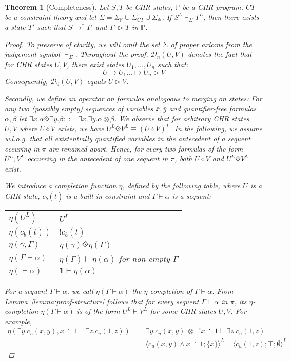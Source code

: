 \documentclass[acmtocl]{acmtrans2m}
\newtheorem{theorem}{Theorem}[section]
\newcommand\state[1]{\langle #1 \rangle}
\newcommand\ent{\rhd}
\newcommand{\bbP}{\ensuremath{\mathbb{P}}}
\newcommand{\cD}{\ensuremath{\mathcal{D}}}
\newcommand{\cb}{\ensuremath{c_b(\bar t)}}
\newcommand{\Sct}{\ensuremath{\Sigma_{CT}}}
\newcommand{\Seq}{\ensuremath{\Sigma_{\doteq}}}
\newcommand{\Sp}{\ensuremath{\Sigma_\mathbb{P}}}
\newcommand{\by}{\bar{y}}
\newcommand{\bx}{\bar{x}}
\newcommand{\x}{{\;\otimes\;}}
\newcommand{\bang}{\; !}
\newcommand{\lone}{\boldsymbol{1}}
\begin{document}
\begin{theorem}[Completeness]
\label{thm:completeness}
   Let $S,T$ be CHR states, $\bbP$ be a CHR program, $CT$ be a constraint theory
   and let  $\Sigma=\Sp\cup\Sct\cup\Seq$. If $S^L\vdash_\Sigma T^L$, then there
   exists a state $T'$ such that $S\mapsto^{*} T'$ and $T'\ent T$ in $\bbP$.
\begin{proof}
To preserve of clarity, we will omit the set $\Sigma$ of proper axioms from the
judgement symbol $\vdash_\Sigma$. Throughout the proof, $\cD_n(U,V)$ denotes
the fact that for CHR states $U,V$, there exist states $U_1,\ldots, U_n$ such that:
	\[
		U \mapsto U_1 \ldots \mapsto U_n \ent V
	\]
Consequently, $\cD_0(U,V)$ equals $U\ent V$.

Secondly, we define an operator on formulas analogoous to merging on states: For
any two (possibly empty) sequences of variables $\bx,\by$ and quantifier-free formulas $\alpha,\beta$ let
$\exists\bx.\alpha\Diamonddot\exists\by.\beta::=\exists\bx.\exists\by.\alpha\otimes\beta$.
We observe that for arbitrary CHR states $U,V$ where $U\diamond V$ exists, we
have $U^L\Diamonddot V^L \equiv (U\diamond V)^L$.
In the following, we assume w.l.o.g. that all existentially quantified variables
in the antecedent of a sequent occuring in $\pi$ are renamed apart. Hence, for
every two formulas of the form $U^L,V^L$ occurring in
the antecedent of one sequent in $\pi$, both $U\diamond V$ and $U^L\Diamonddot V^L$
exist.

We introduce a completion function $\eta$, defined by the following table,
where $U$ is a CHR state, $\cb$ is a built-in constraint and
$\Gamma\vdash\alpha$ is a sequent:

	\medskip
	\begin{tabular}{l @{\hspace{1mm} $::=$ \hspace{1mm}} l}
	  $\eta(U^L)$ & $U^L$ \\
	  $\eta(\cb)$ & $!\cb$ \\
	  $\eta(\gamma,\Gamma)$ & $\eta(\gamma)\Diamonddot\eta(\Gamma)$ \\
	  $\eta(\Gamma\vdash\alpha)$ & $\eta(\Gamma)\vdash\eta(\alpha)$
	  	\quad for non-empty $\Gamma$ \\
	  $\eta(\vdash\alpha)$ & $\lone\vdash\eta(\alpha)$ \\
	\end{tabular}

\medskip
For a sequent $\Gamma\vdash\alpha$, we call $\eta(\Gamma\vdash\alpha)$ the
$\eta$-completion of $\Gamma\vdash\alpha$. From Lemma~\ref{lemma:proof-structure}
follows that for every sequent $\Gamma\vdash\alpha$ in $\pi$, its
$\eta$-completion $\eta(\Gamma\vdash\alpha)$ is of the form $U^L\vdash V^L$ for
some CHR states $U,V$. For example,
	\begin{align*}
	\eta(\exists y.c_u(x,y),x\doteq 1 \vdash \exists z.c_u(1,z)) &
		 =\exists y.c_u(x,y)\x \bang x\doteq 1\vdash \exists
		z.c_u(1,z)\\
	&
		= \state{c_u(x,y)\wedge x\doteq
		1;\{x\}}^L\vdash\state{c_u(1,z);\top;\emptyset}^L
	\end{align*}


\end{proof}
\end{theorem}
\end{document}
